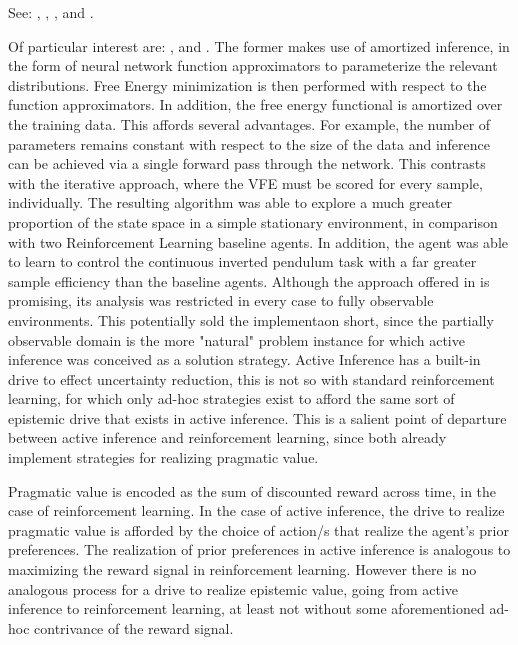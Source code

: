 \documentclass[12pt, oneside]{article}
\begin{document}
See: \textcite{Deep-AIF}, \textcite{Applications-of-FEP-Machine-Learning-Neuroscience}, \textcite{Deep-AIF-As-Var-Policy-Grad}, \textcite{Reinforcement-Learning-Through-AIF} and \textcite{Bayesian-Policy-Selection-Using-AIF}. 

Of particular interest are: \textcite{Scaling-AIF}, \textcite{Bayesian-Policy-Selection-Using-AIF} and \textcite{Contrastive-AIF}. The former makes use of amortized inference, in the form of neural network function approximators to parameterize the relevant distributions. Free Energy minimization is then performed with respect to the function approximators. In addition, the free energy functional is amortized over the training data. This affords several advantages. For example, the number of parameters remains constant with respect to the size of the data and inference can be achieved via a single forward pass through the network. This contrasts with the iterative approach, where the VFE must be scored for every sample, individually. The resulting algorithm was able to explore a much greater proportion of the state space in a simple stationary environment, in comparison with two Reinforcement Learning baseline agents. In addition, the agent was able to learn to control the continuous inverted pendulum task with a far greater sample efficiency than the baseline agents. Although the approach offered in \textcite{Scaling-AIF} is promising, its analysis was restricted in every case to fully observable environments. This potentially sold the implementaon short, since the partially observable domain is the more "natural" problem instance for which active inference was conceived as a solution strategy. Active Inference has a built-in drive to effect uncertainty reduction, this is not so with standard reinforcement learning, for which only ad-hoc strategies exist to afford the same sort of epistemic drive that exists in active inference. This is a salient point of departure between active inference and reinforcement learning, since both already implement strategies for realizing pragmatic value. 

Pragmatic value is encoded as the sum of discounted reward across time, in the case of reinforcement learning. In the case of active inference, the drive to realize pragmatic value is afforded by the choice of action/s that realize the agent's prior preferences. The realization of prior preferences in active inference is analogous to maximizing the reward signal in reinforcement learning. However there is no analogous process for a drive to realize epistemic value, going from active inference to reinforcement learning, at least not without some aforementioned ad-hoc contrivance of the reward signal. 
\end{document}

